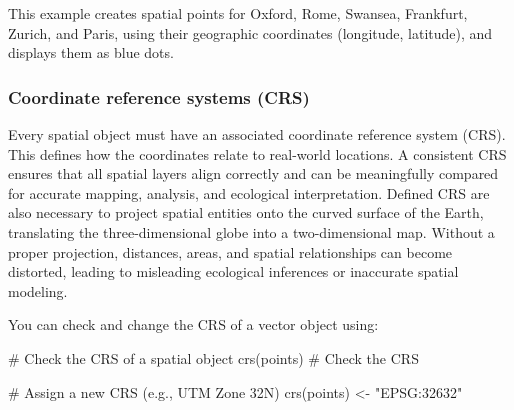 \documentclass[
]{book}
\newenvironment{Shaded}{\begin{snugshade}}{\end{snugshade}}
\newcommand{\CommentTok}[1]{\textcolor[rgb]{0.37,0.37,0.37}{#1}}
\newcommand{\FunctionTok}[1]{\textcolor[rgb]{0.28,0.35,0.67}{#1}}
\newcommand{\NormalTok}[1]{\textcolor[rgb]{0.00,0.23,0.31}{#1}}
\newcommand{\OtherTok}[1]{\textcolor[rgb]{0.00,0.23,0.31}{#1}}
\newcommand{\StringTok}[1]{\textcolor[rgb]{0.13,0.47,0.30}{#1}}
\begin{document}
This example creates spatial points for Oxford, Rome, Swansea,
Frankfurt, Zurich, and Paris, using their geographic coordinates
(longitude, latitude), and displays them as blue dots.

\subsubsection{Coordinate reference systems
(CRS)}\label{coordinate-reference-systems-crs}

Every spatial object must have an associated coordinate reference system
(CRS). This defines how the coordinates relate to real-world locations.
A consistent CRS ensures that all spatial layers align correctly and can
be meaningfully compared for accurate mapping, analysis, and ecological
interpretation. Defined CRS are also necessary to project spatial
entities onto the curved surface of the Earth, translating the
three-dimensional globe into a two-dimensional map. Without a proper
projection, distances, areas, and spatial relationships can become
distorted, leading to misleading ecological inferences or inaccurate
spatial modeling.

You can check and change the CRS of a vector object using:

\begin{Shaded}
\begin{Highlighting}[]
\CommentTok{\# Check the CRS of a spatial object}
\FunctionTok{crs}\NormalTok{(points)         }\CommentTok{\# Check the CRS}

\CommentTok{\# Assign a new CRS (e.g., UTM Zone 32N)}
\FunctionTok{crs}\NormalTok{(points) }\OtherTok{\textless{}{-}} \StringTok{"EPSG:32632"}
\end{Highlighting}
\end{Shaded}
\end{document}
